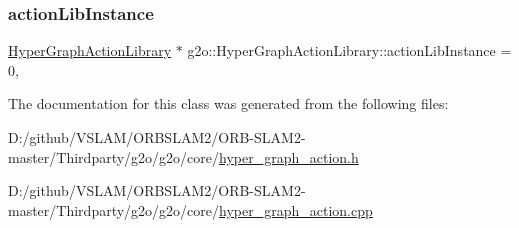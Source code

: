 \subsubsection{\texorpdfstring{action\+Lib\+Instance}{actionLibInstance}}
{\footnotesize\ttfamily \mbox{\hyperlink{classg2o_1_1_hyper_graph_action_library}{Hyper\+Graph\+Action\+Library}} $\ast$ g2o\+::\+Hyper\+Graph\+Action\+Library\+::action\+Lib\+Instance = 0\hspace{0.3cm}{\ttfamily [static]}, {\ttfamily [private]}}



The documentation for this class was generated from the following files\+:\begin{DoxyCompactItemize}
\item 
D\+:/github/\+V\+S\+L\+A\+M/\+O\+R\+B\+S\+L\+A\+M2/\+O\+R\+B-\/\+S\+L\+A\+M2-\/master/\+Thirdparty/g2o/g2o/core/\mbox{\hyperlink{hyper__graph__action_8h}{hyper\+\_\+graph\+\_\+action.\+h}}\item 
D\+:/github/\+V\+S\+L\+A\+M/\+O\+R\+B\+S\+L\+A\+M2/\+O\+R\+B-\/\+S\+L\+A\+M2-\/master/\+Thirdparty/g2o/g2o/core/\mbox{\hyperlink{hyper__graph__action_8cpp}{hyper\+\_\+graph\+\_\+action.\+cpp}}\end{DoxyCompactItemize}

